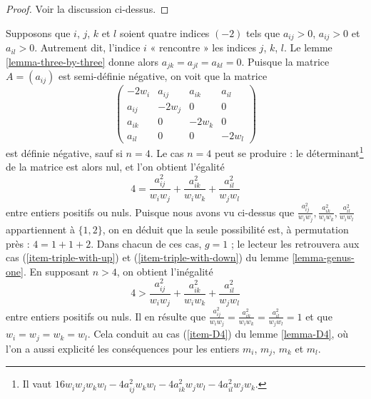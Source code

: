 \begin{proof}
Voir la discussion ci-dessus.
\end{proof}

\noindent
Supposons que $i$, $j$, $k$
et $l$ soient quatre indices $(-2)$ tels que $a_{ij} > 0$, $a_{ij} > 0$ et
$a_{il} > 0$. Autrement dit, l'indice $i$ « rencontre » les indices
$j$, $k$, $l$. Le lemme \ref{lemma-three-by-three} donne alors
$a_{jk} = a_{jl} = a_{kl} = 0$. Puisque la matrice $A = (a_{ij})$ est
semi-définie négative, on voit que la matrice
$$
\left(
\begin{matrix}
-2w_i & a_{ij} & a_{ik} & a_{il} \\
a_{ij} & -2w_j & 0 & 0 \\
a_{ik} & 0 & -2w_k & 0 \\
a_{il} & 0 & 0 & -2w_l
\end{matrix}
\right)
$$
est définie négative, sauf si $n = 4$. Le cas $n = 4$ peut se produire :
le déterminant\footnote{Il vaut
$16w_iw_jw_kw_l - 4a_{ij}^2w_kw_l - 4a_{ik}^2w_jw_l - 4a_{il}^2w_jw_k$.}
de la matrice est alors nul, et l'on obtient l'égalité
$$
4 = \frac{a_{ij}^2}{w_iw_j} + \frac{a_{ik}^2}{w_iw_k} + \frac{a_{il}^2}{w_jw_l}
$$
entre entiers positifs ou nuls. Puisque nous avons vu ci-dessus que
$\frac{a_{ij}^2}{w_iw_j}, \frac{a_{ik}^2}{w_iw_k}, \frac{a_{il}^2}{w_iw_l}$
appartiennent à $\{1, 2\}$, on en déduit que la seule possibilité
est, à permutation près : $4 = 1 + 1 + 2$. Dans chacun de ces
cas, $g = 1$ ; le lecteur les retrouvera aux cas
(\ref{item-triple-with-up}) et (\ref{item-triple-with-down}) du
lemme \ref{lemma-genus-one}. En supposant $n > 4$,
on obtient l'inégalité
$$
4 > \frac{a_{ij}^2}{w_iw_j} + \frac{a_{ik}^2}{w_iw_k} + \frac{a_{il}^2}{w_jw_l}
$$
entre entiers positifs ou nuls. Il en résulte que $\frac{a_{ij}^2}{w_iw_j} =
\frac{a_{ik}^2}{w_iw_k} = \frac{a_{il}^2}{w_jw_l} = 1$
et que $w_i = w_j = w_k = w_l$. Cela conduit au cas
(\ref{item-D4}) du lemme \ref{lemma-D4},
où l'on a aussi explicité les conséquences pour les entiers $m_i$, $m_j$, $m_k$
et $m_l$.

